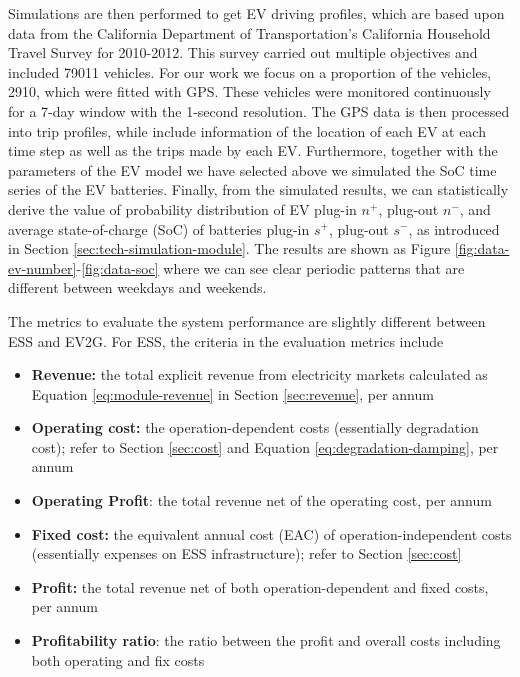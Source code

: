 Simulations are then performed to get EV driving profiles, which are based upon data from the California Department of Transportation's California Household Travel Survey for 2010-2012\cite{NREL_TSDC}. This survey carried out multiple objectives and included 79011 vehicles. For our work we focus on a proportion of the vehicles, 2910, which were fitted with GPS. These vehicles were monitored continuously for a 7-day window with the 1-second resolution. The GPS data is then processed into trip profiles, while include information of the location of each EV at each time step as well as the trips made by each EV. Furthermore, together with the parameters of the EV model we have selected above we simulated the SoC time series of the EV batteries. Finally, from the simulated results, we can statistically derive the value of probability distribution of EV plug-in $n^+$, plug-out $n^-$, and average state-of-charge (SoC) of batteries plug-in $s^+$, plug-out $s^-$, as introduced in Section \ref{sec:tech-simulation-module}. The results are shown as Figure \ref{fig:data-ev-number}-\ref{fig:data-soc} where we can see clear periodic patterns that are different between weekdays and weekends.

The metrics to evaluate the system performance are slightly different between ESS and EV2G. For ESS, the criteria in the evaluation metrics include
\begin{itemize}
	\item \textbf{Revenue:} the total explicit revenue from electricity markets calculated as Equation \eqref{eq:module-revenue} in Section \ref{sec:revenue}, per annum
	\item \textbf{Operating cost:} the operation-dependent costs (essentially degradation cost); refer to Section \ref{sec:cost} and Equation \eqref{eq:degradation-damping}, per annum
	\item \textbf{Operating Profit}: the total revenue net of the operating cost, per annum
	\item \textbf{Fixed cost:} the equivalent annual cost (EAC) of operation-independent costs (essentially expenses on ESS infrastructure); refer to Section \ref{sec:cost}
	\item \textbf{Profit:} the total revenue net of both operation-dependent and fixed costs, per annum
	\item  \textbf{Profitability ratio}: the ratio between the profit and overall costs including both operating and fix costs
\end{itemize}

